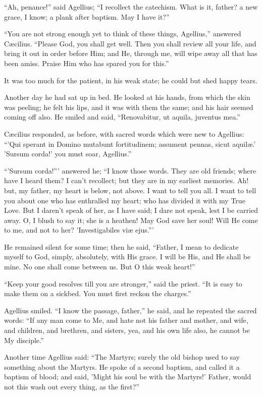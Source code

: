 ``Ah, penance!'' said Agellius; ``I recollect the
catechism. What is it, father? a new grace, I know; a plank after
baptism. May I have it?''

``You are not strong enough yet to think of these things,
Agellius,'' answered Cæcilius. ``Please God, you shall get
well. Then you shall review all your life, and bring it out in order
before Him; and He, through me, will wipe away all that has been
amiss. Praise Him who has spared you for this.''

It was too much for the patient, in his weak state; he could but
shed happy tears.

Another day he had sat up in bed. He looked at his hands, from
which the skin was peeling; he felt his lips, and it was with them the
same; and his hair seemed coming off also. He smiled and said, ``Renovabitur,
ut aquila, juventus mea.''

Cæcilius responded, as before, with sacred words which were new to
Agellius: ``'Qui sperant in Domino mutabunt fortitudinem; assument
pennas, sicut aquilæ.' 'Sursum corda!' you must soar, Agellius.''

``'Sursum corda!''' answered he; ``I know those words.
They are old friends; where have I heard them? I can't recollect; but
they are in my earliest memories. Ah! but, my father, my heart is
below, not above. I want to tell you all. I want to tell you about one
who has enthralled my heart; who has divided it with my True Love. But
I daren't speak of her, as I have said; I dare not speak, lest I be
carried away. O, I blush to say it; she is a heathen! May God save her
soul! Will He come to me, and not to her? 'Investigabiles viæ ejus.'''

He remained silent for some time; then he said, ``Father, I
mean to dedicate myself to God, simply, absolutely, with His grace. I
will be His, and He shall be mine. No one shall come between us. But O
this weak heart!''

``Keep your good resolves till you are stronger,'' said the
priest. ``It is easy to make them on a sickbed. You must first
reckon the charges.''

Agellius smiled. ``I know the passage, father,'' he said,
and he repeated the sacred words: ``If any man come to Me, and
hate not his father and mother, and wife, and children, and brethren,
and sisters, yea, and his own life also, he cannot be My
disciple.''

Another time Agellius said: ``The Martyrs; surely the old
bishop used to say something about the Martyrs. He spoke of a second
baptism, and called it a baptism of blood; and said, 'Might his soul
be with the Martyrs!' Father, would not this wash out every thing, as
the first?''

